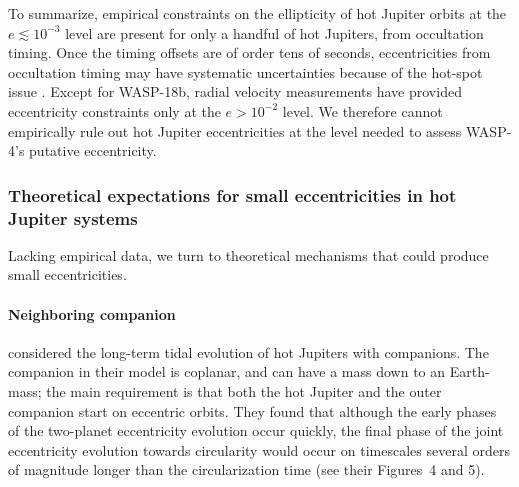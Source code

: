 \documentclass[12pt,twocolumn,tighten]{aastex62}
\begin{document}

To summarize, empirical constraints on the ellipticity of hot Jupiter
orbits at the $e \lesssim 10^{-3}$ level are present for only a
handful of hot Jupiters, from occultation timing.  Once the timing
offsets are of order tens of seconds, eccentricities from occultation
timing may have systematic uncertainties because of the hot-spot issue
\citep{williams_resolving_2006,agol_climate_2010}.  Except for
WASP-18b, radial velocity measurements have provided eccentricity
constraints only at the $e > 10^{-2}$ level.  We therefore cannot
empirically rule out hot Jupiter eccentricities at the level needed to
assess WASP-4's putative eccentricity.

\subsubsection{Theoretical expectations for small eccentricities in hot
Jupiter systems}

Lacking empirical data, we turn to theoretical mechanisms that could
produce small eccentricities.

\paragraph{Neighboring companion}
\citet{mardling_long-term_2007} considered the long-term tidal
evolution of hot Jupiters with companions.  The companion in their
model is coplanar, and can have a mass down to an Earth-mass; the main
requirement is that both the hot Jupiter and the outer companion start
on eccentric orbits.  They found that although the early phases of the
two-planet eccentricity evolution occur quickly, the final phase of
the joint eccentricity evolution towards circularity would occur on
timescales several orders of magnitude longer than the circularization
time (see their Figures~4 and 5).  
\end{document}
